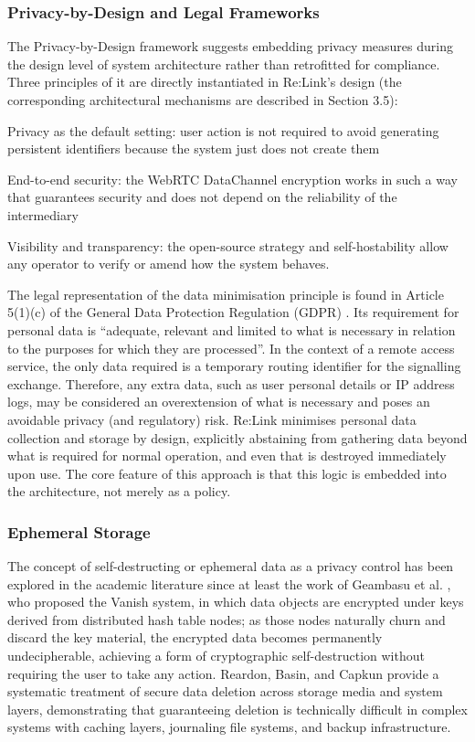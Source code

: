 \documentclass[12pt,a4paper]{article}
\begin{document}
\subsubsection{Privacy-by-Design and Legal Frameworks}

The Privacy-by-Design framework \cite{cavoukian2011} suggests embedding privacy measures during the design level of system architecture rather than retrofitted for compliance. Three principles of it are directly instantiated in Re:Link’s design (the corresponding architectural mechanisms are described in Section 3.5):

Privacy as the default setting: user action is not required to avoid generating persistent identifiers because the system just does not create them

End-to-end security: the WebRTC DataChannel encryption works in such a way that guarantees security and does not depend on the reliability of the intermediary

Visibility and transparency: the open-source strategy and self-hostability allow any operator to verify or amend how the system behaves.

The legal representation of the data minimisation principle is found in Article 5(1)(c) of the General Data Protection Regulation (GDPR) \cite{gdpr5}. Its requirement for personal data is “adequate, relevant and limited to what is necessary in relation to the purposes for which they are processed”. In the context of a remote access service, the only data required is a temporary routing identifier for the signalling exchange. Therefore, any extra data, such as user personal details or IP address logs, may be considered an overextension of what is necessary and poses an avoidable privacy (and regulatory) risk. Re:Link minimises personal data collection and storage by design, explicitly abstaining from gathering data beyond what is required for normal operation, and even that is destroyed immediately upon use. The core feature of this approach is that this logic is embedded into the architecture, not merely as a policy.

\subsubsection{Ephemeral Storage}

The concept of self-destructing or ephemeral data as a privacy control has been explored in the academic literature since at least the work of Geambasu et al. \cite{geambasu2009}, who proposed the Vanish system, in which data objects are encrypted under keys derived from distributed hash table nodes; as those nodes naturally churn and discard the key material, the encrypted data becomes permanently undecipherable, achieving a form of cryptographic self-destruction without requiring the user to take any action. Reardon, Basin, and Capkun \cite{reardon2013} provide a systematic treatment of secure data deletion across storage media and system layers, demonstrating that guaranteeing deletion is technically difficult in complex systems with caching layers, journaling file systems, and backup infrastructure.
\end{document}
